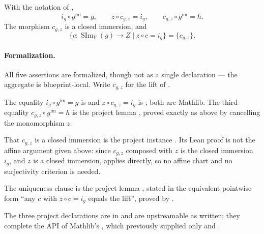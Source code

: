 \begin{lemma}
  \label{lemma:nagata-scheme-image-universal}
  \leanok

  With the notation of
  ,
  \[
    i_g\circ g^{\mathrm{im}}=g,
    \qquad z\circ c_{g,z}=i_g,
    \qquad c_{g,z}\circ g^{\mathrm{im}}=h.
  \]
  The morphism $c_{g,z}$ is a closed immersion, and
  \[
    \{c\colon\operatorname{SIm}_Y(g)\to Z\mid z\circ c=i_g\}
      =\{c_{g,z}\}.
  \]

  \paragraph{Formalization.}
  All five assertions are formalized, though not as a single declaration --- the aggregate is
  blueprint-local.  Write $c_{g,z}$ for the lift of
  .

  The equality $i_g\circ g^{\mathrm{im}}=g$ is
  \texttt{} and $z\circ c_{g,z}=i_g$ is
  \texttt{}; both are Mathlib.  The third equality
  $c_{g,z}\circ g^{\mathrm{im}}=h$ is the project lemma
  \texttt{}, proved exactly as above by cancelling the
  monomorphism $z$.

  That $c_{g,z}$ is a closed immersion is the project instance
  \texttt{}.  Its Lean proof is not the
  affine argument given above: since $c_{g,z}$ composed with $z$ is the closed immersion
  $i_g$, and $z$ is a closed immersion,
  \texttt{} applies directly, so no
  affine chart and no surjectivity criterion is needed.

  The uniqueness clause is the project lemma
  \texttt{}, stated in the equivalent pointwise form
  ``any $c$ with $z\circ c=i_g$ equals the lift'', proved by
  \texttt{}.

  The three project declarations are in
  \texttt{}
  and are upstreamable as written: they complete the API of Mathlib's
  \texttt{}, which previously supplied only
  \texttt{} and \texttt{}.
\end{lemma}

